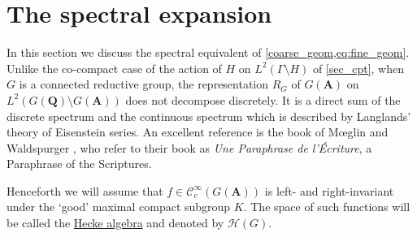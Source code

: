 \documentclass{ims9x6}
\def\A{\mathbf A}
\def\Q{\mathbf Q}
\def\CCC{\mathcal C}
\def\HHH{\mathcal H}
\def\bs{\setminus}
\def\Ltwo{L^2}
\begin{document}
\section{The spectral expansion} \label{sec:spec}

In this section we discuss the spectral equivalent of \cref{coarse_geom,eq:fine_geom}. Unlike the co-compact case of the action of $H$ on $\Ltwo(\Gamma \bs H)$ of \cref{sec_cpt}, when $G$ is a connected reductive group, the representation $R_G$ of $G(\A)$ on $\Ltwo(G(\Q)\bs G(\A))$ does not decompose discretely. It is a direct sum of the discrete spectrum and the continuous spectrum which is described by Langlands' theory of Eisenstein series. An excellent reference is the book of M{\oe}glin and Waldspurger \cite{MW}, who refer to their book as \textit{Une Paraphrase de l'\'{E}criture}, a Paraphrase of the Scriptures. 

Henceforth we will assume that $f \in \CCC^\infty_c(G(\A))$ is left- and right-invariant under the `good' maximal compact subgroup $K$. The space of such functions will be called the \underline{Hecke algebra} and denoted by $\HHH(G)$.
\end{document}
